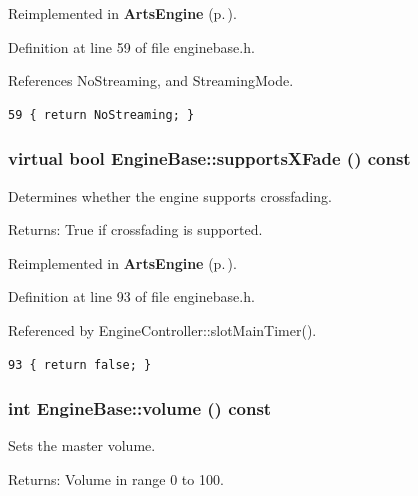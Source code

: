 Reimplemented in {\bf Arts\-Engine} {\rm (p.\,\pageref{classArtsEngine_ArtsEnginea5})}.

Definition at line 59 of file enginebase.h.

References No\-Streaming, and Streaming\-Mode.



\footnotesize\begin{verbatim}59 { return NoStreaming; }       
\end{verbatim}\normalsize 
{}
\subsubsection{\setlength{\rightskip}{0pt plus 5cm}virtual bool Engine\-Base::supports\-XFade () const\hspace{0.3cm}{\tt  [inline, virtual]}}\label{classEngineBase_EngineBasea13}


Determines whether the engine supports crossfading. \begin{Desc}
\item[Returns:]True if crossfading is supported. \end{Desc}


Reimplemented in {\bf Arts\-Engine} {\rm (p.\,\pageref{classArtsEngine_ArtsEnginea18})}.

Definition at line 93 of file enginebase.h.

Referenced by Engine\-Controller::slot\-Main\-Timer().



\footnotesize\begin{verbatim}93 { return false; }
\end{verbatim}\normalsize 
{}
\subsubsection{\setlength{\rightskip}{0pt plus 5cm}int Engine\-Base::volume () const\hspace{0.3cm}{\tt  [inline]}}\label{classEngineBase_EngineBasea10}


Sets the master volume. \begin{Desc}
\item[Returns:]Volume in range 0 to 100. \end{Desc}


